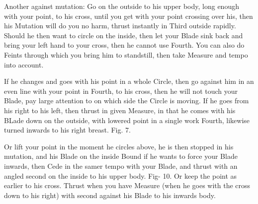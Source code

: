 \exercise{}
Another against mutation: Go on the outside to his upper body, long
enough with your point, to his cross, until you get with your point
crossing over his, then his Mutation will do you no harm, thrust
instantly in Third outside rapidly. Should he then want to
circle on the inside, then let your Blade sink back
and bring your left hand to your cross, then he cannot use Fourth. You
can also do Feints through which you bring him to standstill, then
take Measure and tempo into account.

\exercise{}
If he changes and goes with his point in a whole Circle, then go
against him in an even line with your point in Fourth, to his cross,
then he will not touch your Blade, pay large attention to on which
side the Circle is moving. If he goes from his right to his left, then thrust in
given Measure, in that he comes with his BLade down on the outside,
with lowered point in a single work Fourth, likewise turned inwards to
his right breast. Fig. 7.

\exercise{}
Or lift your point in the moment he circles above, he is then stopped
in his mutation, and his Blade on the inside Bound if he wants to
force your Blade inwards, then Cede in the samer tempo with your
Blade, and thrust with an angled second on the inside to his upper
body. Fig- 10. Or keep the point as earlier to his cross. Thrust when
you have Measure (when he goes with the cross down to his right) with
second against his Blade to his inwards body.


